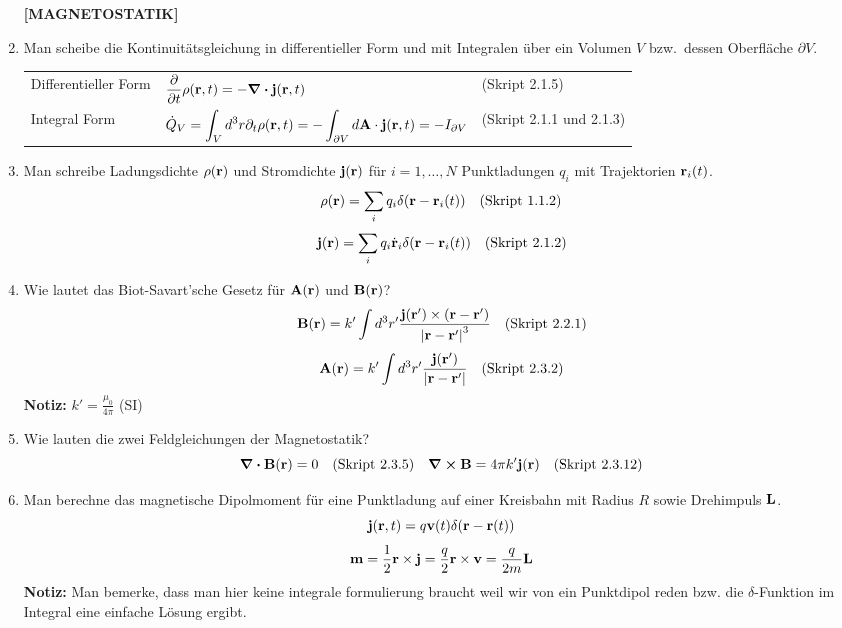\begin{enumerate}
  \textbf{[MAGNETOSTATIK]}
  \item Man scheibe die Kontinuitätsgleichung in differentieller Form
        und mit Integralen über ein Volumen $V$ bzw.\ dessen Oberfläche 
        $\partial V$.
        \begin{center}
        \begin{tabular}{lll}
          Differentieller Form 
                            & $\displaystyle\pdv{t}\rho(\vb r, t)=
                               -\div\vb j(\vb r, t)$
                              & (Skript 2.1.5)\\
          Integral Form     & $\displaystyle\dot Q_V
                              =\int_V d^3r\partial_t\rho(\vb r,t)=
                              -\int_{\partial V}d\vb A\cdot
                              \vb j(\vb r, t)=-I_{\partial V}$
                              & (Skript 2.1.1 und 2.1.3)\\
        \end{tabular}
        \end{center}

  \item Man schreibe Ladungsdichte $\rho(\vb r)$ und Stromdichte
        $\vb j(\vb r)$ für $i=1,\ldots,N$ Punktladungen $q_i$ mit 
        Trajektorien $\vb r_i(t)$.
        $$\rho(\vb r)=\sum_i q_i\delta(\vb r-\vb r_i(t))
        \quad \text{(Skript 1.1.2)}$$
        $$\vb j(\vb r)=\sum_i q_i\dot{\vb r}_i\delta(\vb r-\vb r_i(t))
        \quad \text{(Skript 2.1.2)}$$

  \item Wie lautet das Biot-Savart'sche Gesetz für $\vb A(\vb r)$ und
        $\vb B(\vb r)$?
        $$\vb B(\vb r)=k'\int d^3r'\frac{\vb j(\vb r')\times
        (\vb r-\vb r')}{\abs{\vb r-\vb r'}^3}
        \quad \text{(Skript 2.2.1)}$$
        $$\vb A(\vb r)=k'\int d^3r'\frac{\vb j(\vb r')}{\abs{\vb{r}-\vb{r}'}}
        \quad \text{(Skript 2.3.2)}$$
        \textbf{Notiz:} $k'=\frac{\mu_0}{4\pi}$ (SI)

  \item Wie lauten die zwei Feldgleichungen der Magnetostatik?
    $$\div \vb B(\vb r) = 0\quad\text{(Skript 2.3.5)}
    \quad \curl \vb B= 4\pi k'\vb j(\vb r)\quad\text{(Skript 2.3.12)}$$

  \item Man berechne das magnetische Dipolmoment für eine Punktladung auf
        einer Kreisbahn mit Radius $R$ sowie Drehimpuls $\vb L$.
        $$\vb j(\vb r,t)=q\vb v(t)\delta(\vb r-\vb r(t))$$
        $$\vb m = \frac{1}{2}\vb r \times \vb j=\frac{q}{2}\vb 
        r\times\vb v=\frac{q}{2m}\vb L$$
        \textbf{Notiz:} Man bemerke, dass man hier keine integrale 
        formulierung braucht weil wir von ein Punktdipol reden bzw.
        die $\delta$-Funktion im Integral eine einfache Lösung ergibt.


\end{enumerate}
